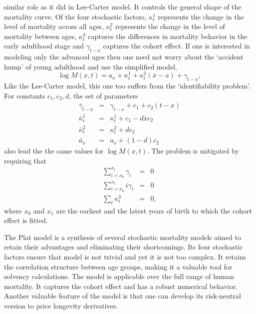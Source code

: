 \documentclass{article}
\numberwithin{equation}{section}
\begin{document}
similar role as it did in Lee-Carter model. It controls the general shape
of the mortality curve. Of the four stochastic factors, $\kappa_t^1$
represents the change in the level of mortality across all ages, $\kappa_t^2$
represents the change in the level of mortality between ages, $\kappa_t^3$
captures the differences in mortality behavior in the early adulthood stage
and $\gamma_{t-x}$ captures the cohort effect. If one is interested in 
modeling only the advanced ages then one need not worry about the `accident
hump' of young adulthood and use the simplified model,
\begin{equation}\label{s9e4}
\log M(x,t) = a_x + \kappa^1_t + \kappa^2_t(\bar{x} - x) + \gamma_{t-x},
\end{equation}
Like the Lee-Carter model, this one too suffers from the `identifiability
problem'. For constants $c_1, c_2, d$, the set of parameters
\begin{eqnarray*}
\bar{\gamma}_{t-x} &=& \gamma_{t-x} + c_1 + c_2(t - x) \\
\bar{\kappa}_t^1 &=& \kappa^1_t + c_1 - d\bar{x}c_2 \\
\bar{\kappa}_t^2 &=& \kappa^2_t + dc_2 \\
\bar{a}_x &=& a_x + (1 - d)c_2
\end{eqnarray*}
also lead the the same values for $\log M(x, t)$. The problem is mitigated 
by requiring that 
\begin{eqnarray*}
\sum_{i=x_0}^{x_1} \gamma_i &=& 0 \\
\sum_{i=x_0}^{x_1} i\gamma_i &=& 0 \\
\sum_t\kappa_t^3 &=& 0,
\end{eqnarray*}
where $x_0$ and $x_1$ are the earliest and the latest years of birth to which
the cohort effect is fitted. 

The Plat model is a synthesis of several stochastic mortality models aimed to
retain their advantages and eliminating their shortcomings. Its four stochastic
factors ensure that model is not trivial and yet it is not too complex. It
retains the correlation structure between age groups, making it a valuable
tool for solvency calculations. The model is applicable over the full range of 
human mortality. It captures the cohort effect and has a robust numerical 
behavior. Another valuable feature of the model is that one can develop its
risk-neutral version to price longevity derivatives.
\end{document}
